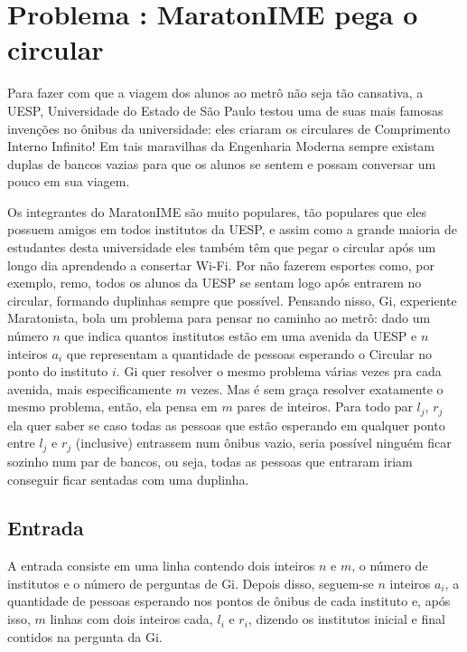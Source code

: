 \section*{Problema \proxLetra: MaratonIME pega o circular}

Para fazer com que a viagem dos alunos ao metrô não seja tão cansativa, a UESP, Universidade do Estado de São Paulo testou uma de suas mais famosas invenções no ônibus da universidade: eles criaram os circulares de Comprimento Interno Infinito! Em tais maravilhas da Engenharia Moderna sempre existam duplas de bancos vazias para que os alunos se sentem e possam conversar um pouco em sua viagem.
 
Os integrantes do MaratonIME são muito populares, tão populares que eles possuem amigos em todos institutos da UESP, e assim como a grande maioria de estudantes desta universidade eles também têm que pegar o circular após um longo dia aprendendo a consertar Wi-Fi. Por não fazerem esportes como, por exemplo, remo, todos os alunos da UESP se sentam logo após entrarem no circular, formando duplinhas sempre que possível. Pensando nisso, Gi, experiente Maratonista, bola um problema para pensar no caminho ao metrô: dado um número $n$ que indica quantos institutos estão em uma avenida da UESP e $n$ inteiros $a_i$ que representam a quantidade de pessoas esperando o Circular no ponto do instituto $i$. Gi quer resolver o mesmo problema várias vezes pra cada avenida, mais especificamente $m$ vezes. Mas é sem graça resolver exatamente o mesmo problema, então, ela pensa em $m$ pares de inteiros. Para todo par $l_j$, $r_j$ ela quer saber se caso todas as pessoas que estão esperando em qualquer ponto entre $l_j$ e $r_j$ (inclusive) entrassem num ônibus vazio, seria possível ninguém ficar sozinho num par de bancos, ou seja, todas as pessoas que entraram iriam conseguir ficar sentadas com uma duplinha.

\subsection*{Entrada}
\textoDiversasInstanciasEOF

A entrada consiste em uma linha contendo dois inteiros $n$ e $m$, o número de institutos e o número de perguntas de Gi. Depois disso, seguem-se $n$ inteiros $a_i$, a quantidade de pessoas esperando nos pontos de ônibus de cada instituto e, após isso, $m$ linhas com dois inteiros cada, $l_i$ e $r_i$, dizendo os institutos inicial e final contidos na pergunta da Gi.


